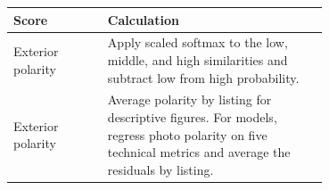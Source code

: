 \begin{tabular}{lp{0.70\linewidth}}
\toprule
Score & Calculation \\
\midrule
Exterior polarity & Apply scaled softmax to the low, middle, and high similarities and subtract low from high probability. \\
Exterior polarity & Average polarity by listing for descriptive figures. For models, regress photo polarity on five technical metrics and average the residuals by listing. \\
\bottomrule
\end{tabular}
